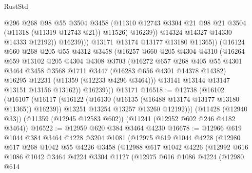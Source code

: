 \begin{lexlean}{RustStd}
\begin{coremodule}
{{{{{{{{{{{{{{{{{{{                          @296
                          @268
                          @98
                          @55
                          @3504
                          @3458
                          (@11310
                            @12743
                            @3304
                            @21
                            @98
                            @21
                            @3504
                            (@11318 (@11319 @12743 @21))
                            @11526)
                          @16239))
                      @14324
                      @14327
                      @14330
                      @14333
                      @12192))
                  @16239)))
            @13171
            @13174
            @13177
            @13180
            @11365))
        (@16124
          @660
          @268
          @205
          @55
          @4312
          @3458
          (@16257
            @660
            @205
            @4304
            @4310
            (@16264
              @659
              @13102
              @205
              @4304
              @4308
              @3703
              (@16272
                @657
                @268
                @405
                @55
                @4301
                @3464
                @3458
                @3568
                @1711
                @3447
                (@16283 @656 @4301 @14378 @14382)
                @16295
                @12231
                (@11359 (@12233 @4296 @3464)))
              @13141
              @13144
              @13147
              @13151
              @13156
              @13162))
          @16239)))
    @13171
@16518 := @12738
    (@16102
      (@16107
        (@16117
          (@16122 (@16130 (@16135 (@16488 @13174 @13177 @13180 @11365)) @16239))
          @13251
          @13254
          @13257
          @13260
          @12192)))
    (@11428 (@12940 @33))
    (@11359 (@12945 @12583 @602))
    (@11241 (@12952 @602 @246 @4182 @3464))
@16522 := @12959 @620 @384 @3464 @4230
@16678 := @12966
    @619
    @1044
    @384
    @3464
    @4228
    @3204
    @1081
    (@12975
      @619
      @1044
      @4228
      (@12980
        @617
        @268
        @1042
        @55
        @4226
        @3458
        (@12988
          @617
          @1042
          @4226
          (@12992
            @616
            @1086
            @1042
            @3464
            @4224
            @3304
            @1127
            (@12975
              @616
              @1086
              @4224
              (@12980
                @614
}}}}}}}}}}}}}}}}}}}
\end{coremodule}
\end{lexlean}
